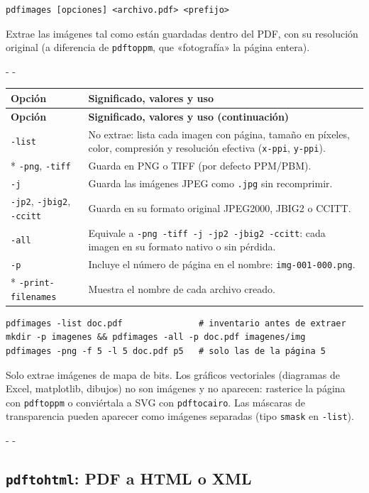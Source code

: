 \documentclass[11pt,a4paper]{article}
\makeatletter
\newcommand{\necesitaespacio}[1]{\par\penalty-100\begingroup
	\setlength{\dimen@}{#1}\dimen@ii\pagegoal\advance\dimen@ii-\pagetotal
	\ifdim\dimen@>\dimen@ii\ifdim\dimen@ii>\z@\vfil\fi\penalty-\@M\fi\endgroup}
\newenvironment{opciones}[1][Opción]{%
	\par\begingroup\small
	\begin{longtable}{L{4.25cm}L{11.2cm}}
		\toprule\rowcolor{tablacab}\cab{#1} & \cab{Significado, valores y uso} \\ \midrule
		\endfirsthead
		\toprule\rowcolor{tablacab}\cab{#1} & \cab{Significado, valores y uso (continuación)} \\ \midrule
		\endhead
		\bottomrule
		\endfoot}
	{\end{longtable}\endgroup}
\newcommand{\cmd}[1]{\texttt{\textcolor{colcmd}{#1}}}      %
\newcommand{\opt}[1]{\texttt{\textcolor{colopt}{#1}}}      %
\newcommand{\arch}[1]{\texttt{\textcolor{colarch}{#1}}}    %
\newcommand{\cab}[1]{\textbf{#1}}
\makeatother
\begin{document}
	\begin{lstlisting}[style=sintaxis]
pdfimages [opciones] <archivo.pdf> <prefijo>
\end{lstlisting}
	
	Extrae las imágenes tal como están guardadas dentro del PDF, con su resolución original (a diferencia de \cmd{pdftoppm}, que «fotografía» la página entera).
	
	\necesitaespacio{18\baselineskip}
	\begin{opciones}
		\opt{-list} & No extrae: lista cada imagen con página, tamaño en píxeles, color, compresión y resolución efectiva (\texttt{x-ppi}, \texttt{y-ppi}).\\*
		\opt{-png}, \opt{-tiff} & Guarda en PNG o TIFF (por defecto PPM/PBM).\\
		\opt{-j} & Guarda las imágenes JPEG como \arch{.jpg} sin recomprimir.\\
		\opt{-jp2}, \opt{-jbig2}, \opt{-ccitt} & Guarda en su formato original JPEG2000, JBIG2 o CCITT.\\
		\opt{-all} & Equivale a \opt{-png -tiff -j -jp2 -jbig2 -ccitt}: cada imagen en su formato nativo o sin pérdida.\\
		\opt{-p} & Incluye el número de página en el nombre: \arch{img-\allowbreak{}001-\allowbreak{}000.png}.\\*
		\opt{-print-\allowbreak{}filenames} & Muestra el nombre de cada archivo creado.\\
	\end{opciones}
	
	\begin{lstlisting}
pdfimages -list doc.pdf               # inventario antes de extraer
mkdir -p imagenes && pdfimages -all -p doc.pdf imagenes/img
pdfimages -png -f 5 -l 5 doc.pdf p5   # solo las de la página 5
\end{lstlisting}
	
	\begin{limitacion}
		Solo extrae imágenes de mapa de bits. Los gráficos vectoriales (diagramas de Excel, matplotlib, dibujos) no son imágenes y no aparecen: rasterice la página con \cmd{pdftoppm} o conviértala a SVG con \cmd{pdftocairo}. Las máscaras de transparencia pueden aparecer como imágenes separadas (tipo \texttt{smask} en \opt{-list}).
	\end{limitacion}
	
	\necesitaespacio{8\baselineskip}
	\subsection{\texttt{pdftohtml}: PDF a HTML o XML}\label{sec:pdftohtml}
	
\end{document}
